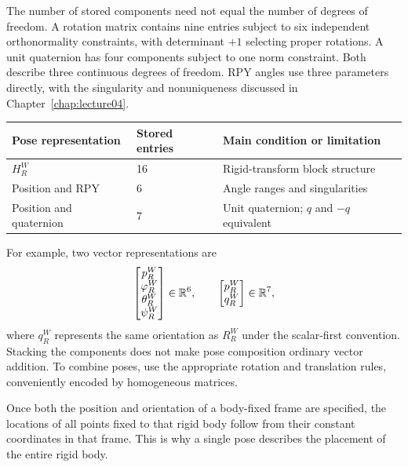 The number of stored components need not equal the number of degrees of
freedom. A rotation matrix contains nine entries subject to six independent
orthonormality constraints, with determinant $+1$ selecting proper rotations.
A unit quaternion has four components subject to one norm constraint.
Both describe three continuous degrees of freedom. RPY angles use three
parameters directly, with the singularity and nonuniqueness discussed in
Chapter~\ref{chap:lecture04}.

\begin{center}
\renewcommand{\arraystretch}{1.25}
\begin{tabular}{lll}
\toprule
Pose representation & Stored entries & Main condition or limitation\\
\midrule
$H_R^W$ & 16 & Rigid-transform block structure\\
Position and RPY & 6 & Angle ranges and singularities\\
Position and quaternion & 7 & Unit quaternion; $q$ and $-q$ equivalent\\
\bottomrule
\end{tabular}
\end{center}

For example, two vector representations are
\[
 \begin{bmatrix}p_R^W\\\varphi_R^W\\\theta_R^W\\\psi_R^W\end{bmatrix}
 \in\mathbb{R}^6,\qquad
 \begin{bmatrix}p_R^W\\q_R^W\end{bmatrix}\in\mathbb{R}^7,
\]
where $q_R^W$ represents the same orientation as $R_R^W$ under the
scalar-first convention. Stacking the components does not make pose
composition ordinary vector addition. To combine poses, use the appropriate
rotation and translation rules, conveniently encoded by homogeneous matrices.

Once both the position and orientation of a body-fixed frame are specified,
the locations of all points fixed to that rigid body follow from their
constant coordinates in that frame. This is why a single pose describes
the placement of the entire rigid body.

\clearpage
